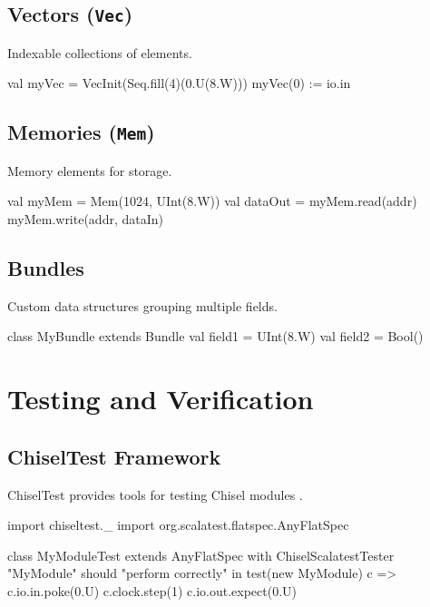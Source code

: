 \subsection{Vectors (\texttt{Vec})}
Indexable collections of elements.
\begin{chiselcode}
val myVec = VecInit(Seq.fill(4)(0.U(8.W)))
myVec(0) := io.in
\end{chiselcode}

\subsection{Memories (\texttt{Mem})}
Memory elements for storage.
\begin{chiselcode}
val myMem = Mem(1024, UInt(8.W))
val dataOut = myMem.read(addr)
myMem.write(addr, dataIn)
\end{chiselcode}

\subsection{Bundles}
Custom data structures grouping multiple fields.
\begin{chiselcode}
class MyBundle extends Bundle {
  val field1 = UInt(8.W)
  val field2 = Bool()
}
\end{chiselcode}

\section{Testing and Verification}
\subsection{ChiselTest Framework}
ChiselTest provides tools for testing Chisel modules \cite{chiseltest}.
\begin{chiselcode}
import chiseltest._
import org.scalatest.flatspec.AnyFlatSpec

class MyModuleTest extends AnyFlatSpec with ChiselScalatestTester {
  "MyModule" should "perform correctly" in {
    test(new MyModule) { c =>
      c.io.in.poke(0.U)
      c.clock.step(1)
      c.io.out.expect(0.U)
    }
  }
}
\end{chiselcode}

